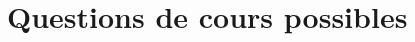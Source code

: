 \documentclass[a4paper, 12pt, final, garamond]{book}
\begin{document}
\vspace{\fill}

\newpage

\section{Questions de cours possibles}

\begin{enumerate}


\end{enumerate}
\end{document}
